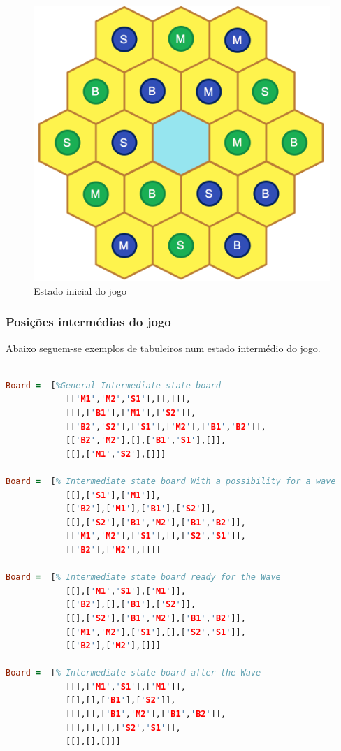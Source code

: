 \documentclass[a4paper]{article}
\begin{document}
\begin{figure}[!ht]
	\begin{center}
	\includegraphics[scale=0.29]{img/init_board.png}
	\caption{Estado inicial do jogo}
    \label{Fig:tabuleiro_inicial}
	\end{center}
\end{figure}

\newpage

\subsubsection{Posições intermédias do jogo} \label{section:intermedia}

Abaixo seguem-se exemplos de tabuleiros num estado intermédio do jogo.

\begin{lstlisting}[language=Prolog]

Board =  [%General Intermediate state board
    	 	[['M1','M2','S1'],[],[]],
         	[[],['B1'],['M1'],['S2']],
         	[['B2','S2'],['S1'],['M2'],['B1','B2']],
    	 	[['B2','M2'],[],['B1','S1'],[]],
    	 	[[],['M1','S2'],[]]]
         
Board =  [% Intermediate state board With a possibility for a wave
    	 	[[],['S1'],['M1']],
         	[['B2'],['M1'],['B1'],['S2']],
         	[[],['S2'],['B1','M2'],['B1','B2']],
    	 	[['M1','M2'],['S1'],[],['S2','S1']],
    	 	[['B2'],['M2'],[]]]
         
Board =  [% Intermediate state board ready for the Wave
    	 	[[],['M1','S1'],['M1']],
         	[['B2'],[],['B1'],['S2']],
         	[[],['S2'],['B1','M2'],['B1','B2']],
    	 	[['M1','M2'],['S1'],[],['S2','S1']],
    	 	[['B2'],['M2'],[]]]
         
Board =  [% Intermediate state board after the Wave
    	 	[[],['M1','S1'],['M1']],
         	[[],[],['B1'],['S2']],
         	[[],[],['B1','M2'],['B1','B2']],
    	 	[[],[],[],['S2','S1']],
    	 	[[],[],[]]]
\end{lstlisting}
\end{document}
